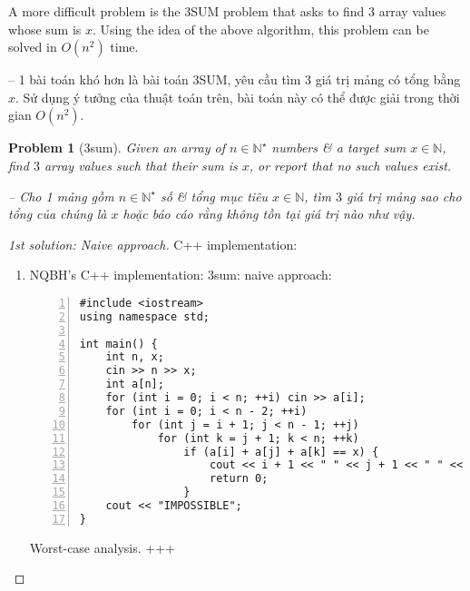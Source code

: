 \documentclass{article}
\newtheorem{problem}{Problem}
\begin{document}
A more difficult problem is the 3SUM problem that asks to find 3 array values whose sum is $x$. Using the idea of the above algorithm, this problem can be solved in $O(n^2)$ time.

-- 1 bài toán khó hơn là bài toán 3SUM, yêu cầu tìm 3 giá trị mảng có tổng bằng $x$. Sử dụng ý tưởng của thuật toán trên, bài toán này có thể được giải trong thời gian $O(n^2)$.

\begin{problem}[{\sc3sum}]
    Given an array of $n\in\mathbb{N}^\star$ numbers \& a target sum $x\in\mathbb{N}$, find $3$ array values such that their sum is $x$, or report that no such values exist.

    -- Cho 1 mảng gồm $n\in\mathbb{N}^\star$ số \& tổng mục tiêu $x\in\mathbb{N}$, tìm $3$ giá trị mảng sao cho tổng của chúng là $x$ hoặc báo cáo rằng không tồn tại giá trị nào như vậy.
\end{problem}

\begin{center}
\end{center}

\begin{proof}[1st solution: Naive approach]
    C++ implementation:
    \begin{enumerate}
        \item NQBH's C++ implementation: 3sum: naive approach:
        \begin{Verbatim}[numbers=left,xleftmargin=5mm]
#include <iostream>
using namespace std;

int main() {
    int n, x;
    cin >> n >> x;
    int a[n];
    for (int i = 0; i < n; ++i) cin >> a[i];
    for (int i = 0; i < n - 2; ++i)
        for (int j = i + 1; j < n - 1; ++j)
            for (int k = j + 1; k < n; ++k)
                if (a[i] + a[j] + a[k] == x) {
                    cout << i + 1 << " " << j + 1 << " " << k + 1;
                    return 0;
                }
    cout << "IMPOSSIBLE";
}
        \end{Verbatim}
        {\sf Worst-case analysis.} +++

    \end{enumerate}
\end{proof}
\end{document}
